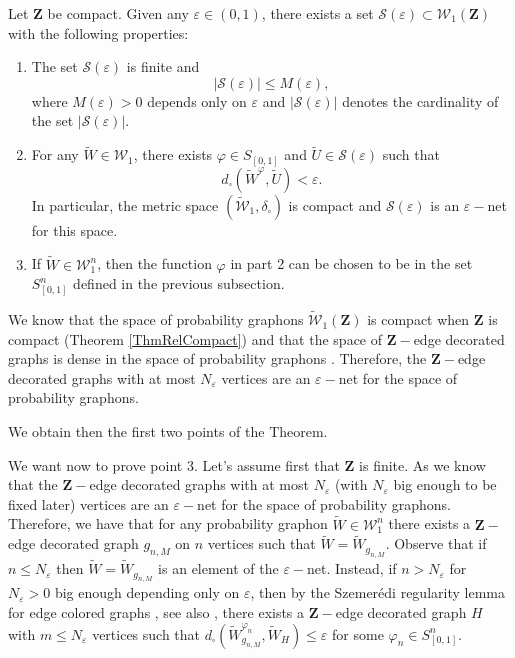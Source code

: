 \documentclass[12pt,twoside,a4paper]{article}
\newcommand{\cS}{{\mathcal S}}  %
\newcommand{\cW}{{\mathcal W}}  %
\newcommand{\Space}{\mathbf{Z}}
\newcommand{\Graphon}{\mathcal{W}_1}
\newcommand{\UGraphon}{\widetilde{\mathcal{W}}_1}
\newcommand{\InvRelabel}{S_{[0,1]}}
\begin{document}
\begin{theorem}\label{thm:reglemma}
Let $\Space$ be compact. Given any $\varepsilon \in (0,1)$, there exists a set $\cS(\varepsilon) \subset \Graphon(\Space)$ with the following properties:
\begin{enumerate}
    \item The set $\cS(\varepsilon)$ is finite and
    \[
     |\cS(\varepsilon)| \leq M(\varepsilon),
    \]
where $M(\varepsilon)>0$ depends only on $\varepsilon$ and $|\cS(\varepsilon)|$ denotes the cardinality of the set $  |\cS(\varepsilon)|.$ 
    \item For any $\widetilde{W} \in \Graphon$, there exists $\varphi \in \InvRelabel$ and $\widetilde{U}\in \cS(\varepsilon)$ such that
    \[
    d_{\square}(\widetilde{W}^{\varphi}, \widetilde{U}) < \varepsilon.
    \]
In particular, the metric space $(\UGraphon, \delta_{\square})$ is compact and $\cS(\varepsilon)$ is an $\varepsilon-$net for this space.
    \item If $\widetilde{W} \in \cW^n_{1}$, then the function $\varphi$ in part 2 can be chosen to be in the set $S^n_{[0,1]}$ defined in the previous subsection.
\end{enumerate}
\end{theorem}
\proof
We know that the space of probability graphons $\UGraphon(\Space)$ is compact when $\Space$ is compact (Theorem \ref{ThmRelCompact}) and that the space of $\Space-$edge decorated graphs is dense in the space of probability graphons  \cite[Lemma 6.12]{abraham2023probabilitygraphons}. Therefore, the $\Space-$edge decorated graphs with at most $N_{\varepsilon}$ vertices are an $\varepsilon-$net for the space of probability graphons. 

We obtain then the first two points of the Theorem.

We want now to prove point $3.$ Let's assume first that $\Space$ is finite. As we know that the $\Space-$edge decorated graphs with at most $N_{\varepsilon}$ (with $N_{\varepsilon}$ big enough to be fixed later) vertices are an $\varepsilon-$net for the space of probability graphons. Therefore, we have that for any probability graphon $\widetilde{W} \in \cW^n_{1}$ there exists a $\Space-$edge decorated graph $g_{n,M}$ on $n$ vertices such that $\widetilde{W} =\widetilde{W}_{g_{n,M}}. $ Observe that if $n\leq N_{\varepsilon}$ then $\widetilde{W} =\widetilde{W}_{g_{n,M}}$ is an element of the $\varepsilon-$net. Instead, if $n> N_{\varepsilon}$ for $N_{\varepsilon}>0$ big enough depending only on $\varepsilon$, then by the Szemerédi regularity lemma for edge colored graphs \cite[Theorem 1.18]{komlos1995szemeredi}, see also \cite{axenovich2011Szemeredi_version, robert_spectral_szemeredi}, there exists a $\Space-$edge decorated graph $H$ with $m\leq N_{\varepsilon}$ vertices such that $d_{\square}(\widetilde{W}^{\varphi_n}_{g_{n,M}},\widetilde{W}_{H})\leq \varepsilon$ for some $\varphi_n\in S^n_{[0,1]}.$
\end{document}
